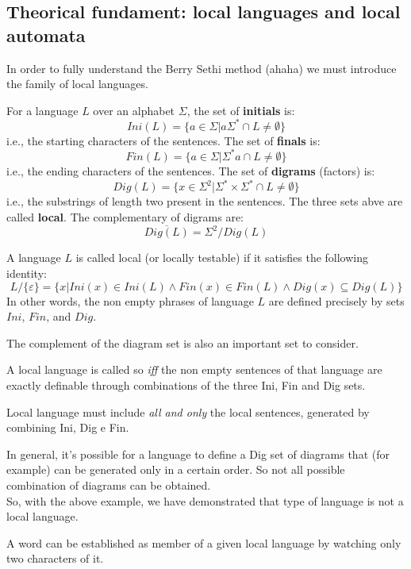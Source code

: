 		\subsection{Theorical fundament: local languages and local automata}
			In order to fully understand the Berry Sethi method (ahaha) we must introduce the family of local languages.
			\begin{definition}
				For a language $L$ over an alphabet $\Sigma$, the set of \textbf{initials} is:
				$$Ini(L)=\lbrace a\in\Sigma\vert a\Sigma^*\cap L\neq\emptyset\rbrace$$
				i.e., the starting characters of the sentences. The set of \textbf{finals} is:
				$$Fin(L)=\lbrace a\in\Sigma\vert \Sigma^* a\cap L\neq\emptyset\rbrace$$
				i.e., the ending characters of the sentences. The set of \textbf{digrams} (factors) is:
				$$Dig(L)=\lbrace x\in\Sigma^2\vert\Sigma^*\times\Sigma^*\cap L\neq\emptyset\rbrace$$
				i.e., the substrings of length two present in the sentences. The three sets abve are called \textbf{local}.
				The complementary of digrams are:
				$$\overline{Dig(L)}=\Sigma^2/Dig(L)$$
			\end{definition}

			\begin{definition}
				A language $L$ is called local (or locally testable) if it satisfies the following identity:
				$$L/\lbrace\varepsilon\rbrace =\lbrace x\vert Ini(x)\in Ini(L)\wedge Fin(x)\in Fin(L)\wedge Dig(x)\subseteq Dig(L)\rbrace$$
				In other words, the non empty phrases of language $L$ are defined precisely by sets $Ini$, $Fin$, and $Dig$.
			\end{definition}


			The complement of the diagram set is also an important set to consider.\\
			\begin{corollary}
				A local language is called so \emph{iff} the non empty sentences of that language are exactly definable through combinations of the three Ini, Fin and Dig sets.
			\end{corollary}
			\begin{corollary}
				Local language must include \emph{all and only} the local sentences, generated by combining Ini, Dig e Fin.
			\end{corollary}

			In general, it's possible for a language to define a Dig set of diagrams that (for example) can be generated only in a certain order.
			So not all possible combination of diagrams can be obtained.\\
			So, with the above example, we have demonstrated that type of language is not a local language.
			\begin{property}
				A word can be established as member of a given local language by watching only two characters of it. 
			\end{property}
